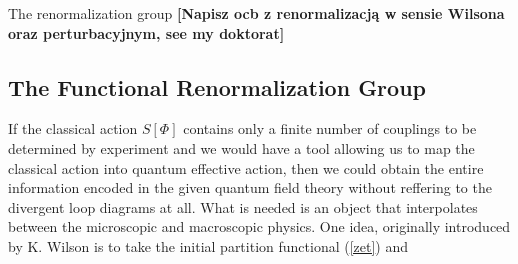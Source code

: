 \documentclass[11pt, a4paper]{article}
\newcommand{\jhk}[1]{{\color{red}#1}}
\newcommand{\jhkbf}[1]{\textbf{\color{red} [#1]}}
\newcommand{\jhk}[1]{{\color{red}#1}}
\newcommand{\jhkbf}[1]{\textbf{\color{red} [#1]}}
\begin{document}




\jhk{The renormalization group}
\jhkbf{Napisz ocb z renormalizacją w sensie Wilsona oraz perturbacyjnym, see my doktorat}
\subsection{The Functional Renormalization Group}
If the classical action $S[\Phi]$ contains only a finite number of couplings to be determined by experiment and
we would have a tool allowing us to map the classical action into quantum effective action, then we could obtain the
entire information encoded in the given quantum field theory without reffering to the divergent loop
diagrams at all. What is needed is an object that interpolates between the microscopic and macroscopic
physics.
One idea, originally introduced by K. Wilson is to take the initial partition functional (\ref{zet}) and
\end{document}
